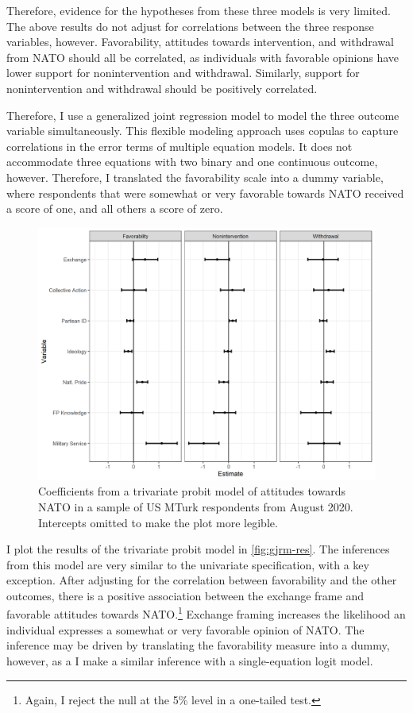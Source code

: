 \documentclass[12pt]{article}
\begin{document}
Therefore, evidence for the hypotheses from these three models is very limited. 
The above results do not adjust for correlations between the three response variables, however.
Favorability, attitudes towards intervention, and withdrawal from NATO should all be correlated, as individuals with favorable opinions have lower support for nonintervention and withdrawal.
Similarly, support for nonintervention and withdrawal should be positively correlated. 


Therefore, I use a generalized joint regression model \citep{Braumoelleretal2018} to model the three outcome variable simultaneously. 
This flexible modeling approach uses copulas to capture correlations in the error terms of multiple equation models. 
It does not accommodate three equations with two binary and one continuous outcome, however. 
Therefore, I translated the favorability scale into a dummy variable, where respondents that were somewhat or very favorable towards NATO received a score of one, and all others a score of zero. 


\begin{figure}
\includegraphics[width = .95\textwidth]{../figures/gjrm-res.png} 
\caption{Coefficients from a trivariate probit model of attitudes towards NATO in a sample of US MTurk respondents from August 2020. Intercepts omitted to make the plot more legible.}
\label{fig:gjrm-res} 
\end{figure} 


I plot the results of the trivariate probit model in \autoref{fig:gjrm-res}. 
The inferences from this model are very similar to the univariate specification, with a key exception. 
After adjusting for the correlation between favorability and the other outcomes, there is a positive association between the exchange frame and favorable attitudes towards NATO.\footnote{Again, I reject the null at the 5\% level in a one-tailed test.}
Exchange framing increases the likelihood an individual expresses a somewhat or very favorable opinion of NATO.  
The inference may be driven by translating the favorability measure into a dummy, however, as a I make a similar inference with a single-equation logit model.  
\end{document}
